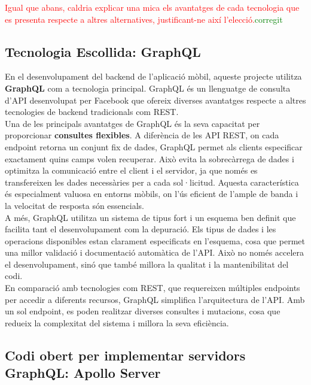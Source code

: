 \documentclass[a4paper,12pt,twoside]{ThesisStyle}
\newcommand{\pau}[1]{\textcolor{red}{#1}}
\newcommand{\sudan}[1]{\textcolor{green}{#1}}
\begin{document}
\pau{Igual que abans, caldria explicar una mica els avantatges de cada tecnologia que es presenta respecte a altres alternatives, justificant-ne així l'elecció.}\sudan{corregit}


\subsection{Tecnologia Escollida: GraphQL}
\label{subsec: Tecnologies Escollida: GraphQL}

En el desenvolupament del backend de l'aplicació mòbil, aqueste projecte utilitza \textbf{GraphQL} com a tecnologia principal. GraphQL és un llenguatge de consulta d'API desenvolupat per Facebook que ofereix diverses avantatges respecte a altres tecnologies de backend tradicionals com REST.\\

Una de les principals avantatges de GraphQL és la seva capacitat per proporcionar \textbf{consultes flexibles}. A diferència de les API REST, on cada endpoint retorna un conjunt fix de dades, GraphQL permet als clients especificar exactament quins camps volen recuperar. Això evita la sobrecàrrega de dades i optimitza la comunicació entre el client i el servidor, ja que només es transfereixen les dades necessàries per a cada sol·licitud. Aquesta característica és especialment valuosa en entorns mòbils, on l'ús eficient de l'ample de banda i la velocitat de resposta són essencials.\\

A més, GraphQL utilitza un sistema de tipus fort i un esquema ben definit que facilita tant el desenvolupament com la depuració. Els tipus de dades i les operacions disponibles estan clarament especificats en l’esquema, cosa que permet una millor validació i documentació automàtica de l'API. Això no només accelera el desenvolupament, sinó que també millora la qualitat i la mantenibilitat del codi.\\

En comparació amb tecnologies com REST, que requereixen múltiples endpoints per accedir a diferents recursos, GraphQL simplifica l'arquitectura de l'API. Amb un sol endpoint, es poden realitzar diverses consultes i mutacions, cosa que redueix la complexitat del sistema i millora la seva eficiència.


\subsection{Codi obert per implementar servidors GraphQL: Apollo Server}
\label{Codi obert per implementar servidors GraphQL: Apollo Server}
\end{document}
